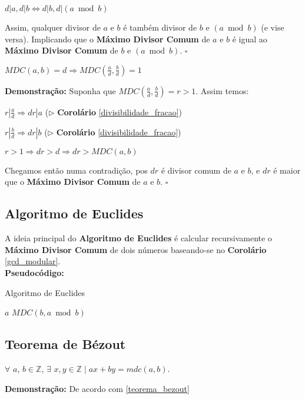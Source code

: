 $d|a, d|b \Leftrightarrow d|b, d|(a \bmod b)$

Assim, qualquer divisor de $a$ e $b$ é também divisor de $b$ e $(a \bmod b)$ (e vise versa). Implicando que o \textbf{Máximo Divisor Comum} de $a$ e $b$
é igual ao \textbf{Máximo Divisor Comum} de $b$ e $(a \bmod b)$. $\square$



\begin{corollary}\label{divisibilidade_mdc}
$MDC(a,b) = d \Rightarrow MDC(\frac{a}{d}, \frac{b}{d}) = 1$
\end{corollary}
\textbf{Demonstração:}
Suponha que $MDC(\frac{a}{d}, \frac{b}{d}) = r > 1$. Assim temos:

$r|\frac{a}{d} \Rightarrow dr|a$ ($\triangleright$ \textbf{Corolário} \autoref{divisibilidade_fracao})

$r|\frac{b}{d} \Rightarrow dr|b$ ($\triangleright$ \textbf{Corolário} \autoref{divisibilidade_fracao})

$r > 1 \Rightarrow dr > d \Rightarrow dr > MDC(a,b)$

Chegamos então numa contradição, pos $dr$ é divisor comum de $a$ e $b$, e $dr$ é maior que o \textbf{Máximo Divisor Comum} de $a$ e $b$. $\square$

\subsection{Algoritmo de Euclides}
A ideia principal do \textbf{Algoritmo de Euclides} é calcular recursivamente o \textbf{Máximo Divisor Comum} de dois números baseando-se no 
\textbf{Corolário} \autoref{gcd_modular}.\\

\textbf{Pseudocódigo:}
\begin{algorithm}
\caption{Algoritmo de Euclides}\label{mdc}
\begin{algorithmic}[1]
\State \Return $a$
\Else
\State \Return $MDC(b, a \bmod b)$
\EndIf
\EndProcedure
\end{algorithmic}
\end{algorithm}




\subsection{Teorema de Bézout}

\begin{theorem}\label{teorema_bezout}
$\forall$ $a$, $b \in \mathbb{Z}$, $\exists$ $x, y \in \mathbb{Z} \mid ax + by = mdc(a, b).$
\end{theorem}
\textbf{Demonstração:}
De acordo com \autoref{teorema_bezout}




